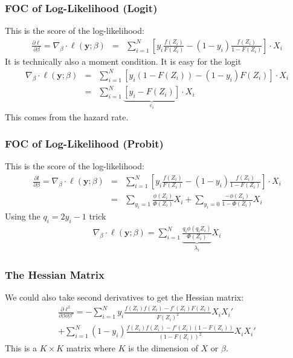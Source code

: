 \documentclass[aspectratio=169]{beamer}
\begin{document}
\begin{frame}
\frametitle{FOC of Log-Likelihood (Logit)}
This is the \alert{score} of the log-likelihood:
\begin{eqnarray*}
\frac{\partial \ell }{\partial \beta} = \nabla_{\beta} \cdot \ell(\mathbf{y}; \beta) &=&  \sum_{i=1}^N  \left[ y_i \frac{ f(Z_i) }{ F(Z_i)}  -  (1-y_i) \frac{f(Z_i) }{1-F(Z_i)} \right]  \cdot X_i 
\end{eqnarray*}
It is technically also a \alert{moment condition}. It is easy for the logit
\begin{eqnarray*}
 \nabla_{\beta} \cdot \ell(\mathbf{y}; \beta) &=&  \sum_{i=1}^N  \left[ y_i (1-F(Z_i)) -  (1-y_i) F(Z_i) \right] \cdot X_i \\
 &=&  \sum_{i=1}^N  \underbrace{\left[ y_i - F(Z_i) \right]}_{\varepsilon_i} \cdot X_i 
\end{eqnarray*}
This comes from the hazard rate.
\end{frame}

\begin{frame}
\frametitle{FOC of Log-Likelihood (Probit)}
This is the \alert{score} of the log-likelihood:
\begin{eqnarray*}
\frac{\partial l }{\partial \beta} = \nabla_{\beta} \cdot \ell(\mathbf{y}; \beta) &=&  \sum_{i=1}^N  \left[ y_i \frac{ f(Z_i) }{ F(Z_i)}  -  (1-y_i) \frac{f(Z_i) }{1-F(Z_i)} \right] \cdot X_i  \\
 &=&  \sum_{y_i=1}  \frac{\phi(Z_i) }{ \Phi(Z_i)} X_i +\sum_{y_i=0} \frac{-\phi(Z_i) }{1-\Phi(Z_i)} X_i
\end{eqnarray*}
Using the $q_i = 2 y_i -1$ trick
\begin{eqnarray*}
\nabla_{\beta} \cdot \ell(\mathbf{y}; \beta)= \sum_{i=1}^N \underbrace{\frac{ q_i \phi(q_i Z_i)}{\Phi(Z_i)}}_{\lambda_i} X_i
\end{eqnarray*}
\end{frame}


\begin{frame}
\frametitle{The Hessian Matrix}
We could also take second derivatives to get the \alert{Hessian} matrix:
\begin{eqnarray*}
\frac{\partial \ell^2 }{\partial \beta \partial \beta'} = - \sum_{i=1}^N   y_i \frac{ f(Z_i)  f(Z_i) - f'(Z_i) F(Z_i) }{ F(Z_i)^2}  X_i X_i' \\
+  \sum_{i=1}^N   (1-y_i) \frac{f(Z_i)f(Z_i) - f'(Z_i)(1-F(Z_i))}{(1-F(Z_i))^2}  X_i X_i'
\end{eqnarray*}
This is a $K\times K$ matrix where $K$ is the dimension of $X$ or $\beta$.
\end{frame}
\end{document}
